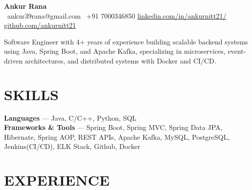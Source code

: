 \documentclass[11.9pt,a4paper]{article}
\begin{document}
\begin{center}
  {\Large \textbf{Ankur Rana}}\\[7pt]
  {\small
    \Letter\ ankur39rana@gmail.com \enspace\textbar\enspace
    \phone\ +91 7000346850 \enspace\textbar\enspace
    \href{https://www.linkedin.com/in/ankurnitt21/}{linkedin.com/in/ankurnitt21/} \enspace\textbar\enspace
    \href{https://github.com/ankurnitt21}{github.com/ankurnitt21}
  }
\end{center}

\vspace{8pt}

Software Engineer with 4+ years of experience building scalable backend systems using Java, Spring Boot, and Apache Kafka, specializing in microservices, event-driven architectures, and distributed systems with Docker and CI/​CD.


\vspace{8pt}
\section*{SKILLS}

\noindent
\textbf{Languages} --- Java, C/C++, Python, SQL\\[3pt]
\textbf{Frameworks \& Tools} --- Spring Boot, Spring MVC, Spring Data JPA, Hibernate, Spring AOP,
REST APIs, Apache Kafka, MySQL, PostgreSQL, Jenkins(CI/CD), ELK Stack, Github, Docker

\vspace{6pt}

\section*{EXPERIENCE}
\end{document}
